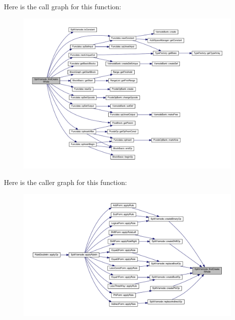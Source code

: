 Here is the call graph for this function\+:
\nopagebreak
\begin{figure}[H]
\begin{center}
\leavevmode
\includegraphics[width=350pt]{class_split_varnode_a957febfb33e3d53592bb677c388384e9_cgraph}
\end{center}
\end{figure}
Here is the caller graph for this function\+:
\nopagebreak
\begin{figure}[H]
\begin{center}
\leavevmode
\includegraphics[width=350pt]{class_split_varnode_a957febfb33e3d53592bb677c388384e9_icgraph}
\end{center}
\end{figure}
\mbox{\label{class_split_varnode_a2368506098ff81b475bc1e32d428a16c}} 
